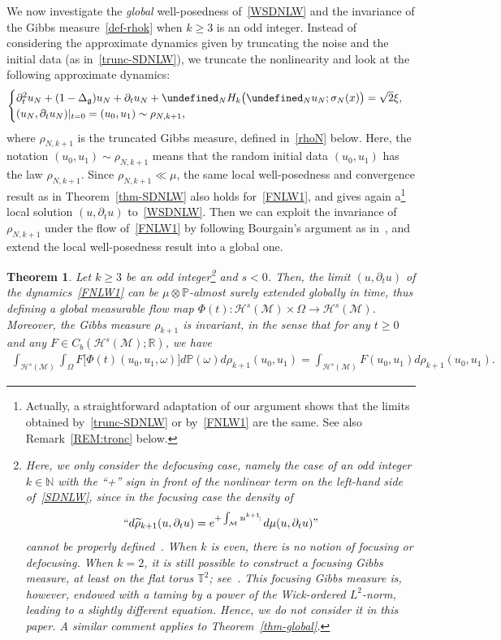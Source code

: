 \documentclass[10pt]{amsart}
\newtheorem{theo}{Theorem}[section]
\theoremstyle{definition}\newtheorem{defi}[theo]{Definition}\newtheorem{rema}[theo]{Remark}\newtheorem{exam}[theo]{Example}\newtheorem{exem}[theo]{Example}\newtheorem{nota}[theo]{Notation}
\newcommand{\R}{\mathbb{R}}
\newcommand{\T}{\mathbb{T}}
\newcommand{\Prob}{\mathbb{P}}
\newcommand{\N}{\mathbb{N}}
\let\P= \undefined
\newcommand{\P}{\mathbf{P}}
\newcommand{\M}{\mathcal{M}}
\renewcommand{\H}{\mathcal{H}}
\newcommand{\g}{\mathfrak{g}}
\newcommand{\Dlg}{\Delta_{\g}}
\newcommand{\s}{\sigma}
\newcommand{\dt}{\partial_t}
\renewcommand{\o}{\omega}
\renewcommand{\O}{\Omega}
\begin{document}
We now investigate the \emph{global} well-posedness of~\eqref{WSDNLW} and the invariance of the Gibbs measure~\eqref{def-rhok} when $k\ge 3$ is an odd integer. Instead of considering the approximate dynamics given by truncating the noise and the initial data (as in~\eqref{trunc-SDNLW}), we truncate the nonlinearity and look at the following approximate dynamics:
\begin{equation}\label{FNLW1}
\begin{cases}
\dt^2 u_N +(1-\Dlg)u_N + \dt u_N + \P_NH_k\big(\P_N u_N;\s_N(x)\big) = \sqrt{2}\xi,\\
(u_N,\dt u_N)|_{t=0}=(u_0,u_1)\sim\rho_{N,k+1},
\end{cases}
\end{equation}
where $\rho_{N,k+1}$ is the truncated Gibbs measure, defined in~\eqref{rhoN} below. Here, the notation $(u_0,u_1)\sim\rho_{N,k+1}$ means that the random initial data $(u_0, u_1)$ has the law $\rho_{N, k+1}$. Since $\rho_{N,k+1}\ll\mu$, the same local well-posedness and convergence result as in Theorem~\ref{thm-SDNLW} also holds for~\eqref{FNLW1}, and gives again a\footnote{Actually, a straightforward adaptation of our argument shows that the limits obtained by~\eqref{trunc-SDNLW} or by~\eqref{FNLW1} are the same. See also Remark~\ref{REM:tronc} below.} local solution $(u,\dt u)$ to~\eqref{WSDNLW}. Then we can exploit the invariance of $\rho_{N,k+1}$ under the flow of~\eqref{FNLW1} by following Bourgain's argument as in~\cite{BO94,BO96,Tz,BT2,BTT2}, and extend the local well-posedness result into a global one.

\begin{theo}\label{thm-invariance}
Let $k \geq 3$ be an odd integer\footnote{Here, we only consider the defocusing case, namely the case of an odd integer $k\in\N$ with the ``+'' sign in front of the nonlinear term on the left-hand side of~\eqref{SDNLW}, since in the focusing case the density of 
\[
``d\widetilde{\rho}_{k+1}(u,\dt u)=e^{+\int_\M\,:\!u^{k+1}\!:\,}d\mu(u,\dt u)\text{''}
\]
cannot be properly defined~\cite{BS, OST}. When $k$ is even, there is no notion of focusing or defocusing. When $k = 2$, it is still possible to construct a focusing Gibbs measure, at least on the flat torus $\T^2$; see~\cite{BO95, OST}. This focusing Gibbs measure is, however, endowed with a taming by a power of the Wick-ordered $L^2$-norm, leading to a slightly different equation. Hence, we do not consider it in this paper. A similar comment applies to Theorem~\ref{thm-global}.} and $s < 0$. Then, the limit $(u,\dt u)$ of the dynamics~\eqref{FNLW1} can be $\mu\otimes\Prob$-almost surely extended globally in time, thus defining a global measurable flow map $\Phi(t) : \H^s(\M)\times \O \to \H^s(\M)$. Moreover, the Gibbs measure $\rho_{k+1}$ is invariant, in the sense that for any $t\ge 0$ and any $F\in C_b(\H^s(\M);\R)$, we have
\begin{align*}
\int_{\H^s(\M)}\int_\O F\big[\Phi(t)(u_0,u_1,\o)\big]d\Prob(\o)d\rho_{k+1}(u_0,u_1) = \int_{\H^s(\M)}F(u_0,u_1)d\rho_{k+1}(u_0,u_1).
\end{align*}
\end{theo}
\end{document}
